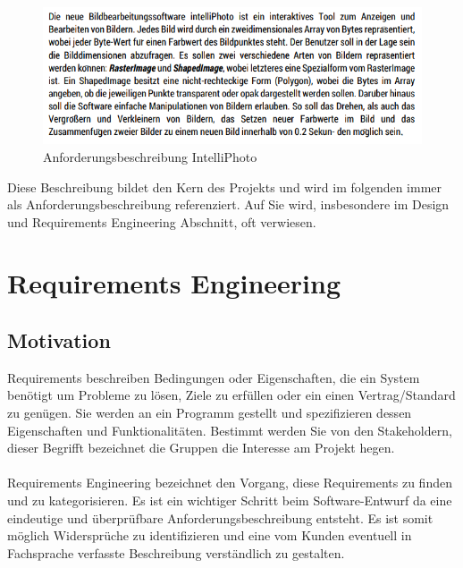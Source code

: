 \documentclass[11pt,a4paper]{article}
\begin{document}
\begin{figure}[H]
  \centering
  \includegraphics[width=\textwidth,frame]{Anforderungsbeschr.png}
	\caption{Anforderungsbeschreibung IntelliPhoto}
	\label{fig2}
\end{figure}
\noindent
Diese Beschreibung bildet den Kern des Projekts und wird im folgenden immer als Anforderungsbeschreibung referenziert. Auf Sie wird, insbesondere im Design und Requirements Engineering Abschnitt, oft verwiesen. 


	
	
\section{Requirements Engineering} 

\subsection{Motivation}
Requirements beschreiben Bedingungen oder Eigenschaften, die ein System benötigt um Probleme zu lösen, Ziele zu erfüllen oder ein einen Vertrag/Standard zu genügen. Sie werden an ein Programm gestellt und spezifizieren dessen Eigenschaften und Funktionalitäten. Bestimmt werden Sie von den Stakeholdern, dieser Begrifft bezeichnet die Gruppen die Interesse am Projekt hegen.\\
\\
Requirements Engineering bezeichnet den Vorgang, diese Requirements zu finden und zu kategorisieren. Es ist ein wichtiger Schritt beim Software-Entwurf da eine eindeutige und überprüfbare Anforderungsbeschreibung entsteht. Es ist somit möglich Widersprüche zu identifizieren und eine vom Kunden eventuell in Fachsprache verfasste Beschreibung verständlich zu gestalten. 
\end{document}
